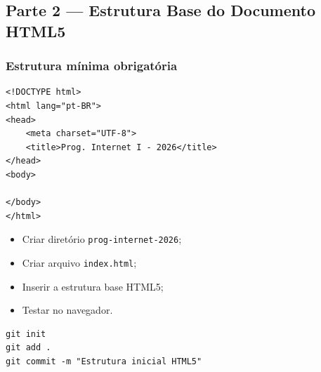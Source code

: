 \documentclass[12pt,a4paper]{article}
\begin{document}

\subsection{Parte 2 — Estrutura Base do Documento HTML5}

\subsubsection{Estrutura mínima obrigatória}

\begin{boxCodigo}
\begin{verbatim}
<!DOCTYPE html>
<html lang="pt-BR">
<head>
    <meta charset="UTF-8">
    <title>Prog. Internet I - 2026</title>
</head>
<body>

</body>
</html>
\end{verbatim}
\end{boxCodigo}



\begin{boxAtividade}

\begin{itemize}
\item Criar diretório \texttt{prog-internet-2026};
\item Criar arquivo \texttt{index.html};
\item Inserir a estrutura base HTML5;
\item Testar no navegador.
\end{itemize}

\end{boxAtividade}

\vspace{0.5cm}

\begin{boxAtividade}

\begin{boxCodigo}
\begin{verbatim}
git init
git add .
git commit -m "Estrutura inicial HTML5"
\end{verbatim}
\end{boxCodigo}

\end{boxAtividade}


\end{document}
